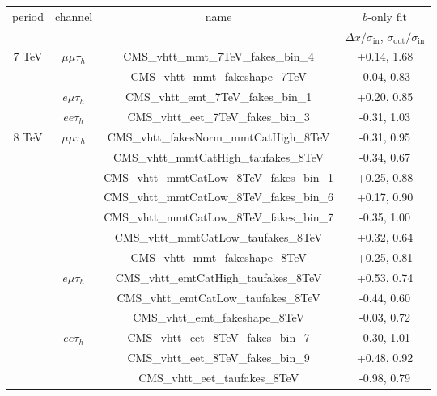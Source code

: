 \begin{tabular}{c c c c } \hline 
\multirow{2}{*}{ period } & \multirow{2}{*}{channel} & \multirow{2}{*}{name} &     $b$-only fit \\
 &  & &  $\Delta x/\sigma_{\text{in}}$, $\sigma_{\text{out}}/\sigma_{\text{in}}$ \\  
\hline
\multirow{4}{*}{ 7 TeV } & \multirow{2}{*}{ $\mu\mu\tau_h$ } & CMS\_vhtt\_mmt\_7TeV\_fakes\_bin\_4      &      +0.14, 1.68 \\
& & CMS\_vhtt\_mmt\_fakeshape\_7TeV          &      -0.04, 0.83 \\
 \cline{2-4}
& $e\mu\tau_h$ & CMS\_vhtt\_emt\_7TeV\_fakes\_bin\_1      &      +0.20, 0.85 \\
 \cline{2-4}
& $ee\tau_h$ & CMS\_vhtt\_eet\_7TeV\_fakes\_bin\_3      &      -0.31, 1.03 \\
 \hline
\multirow{13}{*}{ 8 TeV } & \multirow{7}{*}{ $\mu\mu\tau_h$ } & CMS\_vhtt\_fakesNorm\_mmtCatHigh\_8TeV   &      -0.31, 0.95 \\
& & CMS\_vhtt\_mmtCatHigh\_taufakes\_8TeV    &      -0.34, 0.67 \\
& & CMS\_vhtt\_mmtCatLow\_8TeV\_fakes\_bin\_1 &      +0.25, 0.88 \\
& & CMS\_vhtt\_mmtCatLow\_8TeV\_fakes\_bin\_6 &      +0.17, 0.90 \\
& & CMS\_vhtt\_mmtCatLow\_8TeV\_fakes\_bin\_7 &      -0.35, 1.00 \\
& & CMS\_vhtt\_mmtCatLow\_taufakes\_8TeV     &      +0.32, 0.64 \\
& & CMS\_vhtt\_mmt\_fakeshape\_8TeV          &      +0.25, 0.81 \\
 \cline{2-4}
& \multirow{3}{*}{ $e\mu\tau_h$ } & CMS\_vhtt\_emtCatHigh\_taufakes\_8TeV    &      +0.53, 0.74 \\
& & CMS\_vhtt\_emtCatLow\_taufakes\_8TeV     &      -0.44, 0.60 \\
& & CMS\_vhtt\_emt\_fakeshape\_8TeV          &      -0.03, 0.72 \\
 \cline{2-4}
& \multirow{3}{*}{ $ee\tau_h$ } & CMS\_vhtt\_eet\_8TeV\_fakes\_bin\_7      &      -0.30, 1.01 \\
& & CMS\_vhtt\_eet\_8TeV\_fakes\_bin\_9      &      +0.48, 0.92 \\
& & CMS\_vhtt\_eet\_taufakes\_8TeV           &      -0.98, 0.79 \\
 \hline
\end{tabular}
